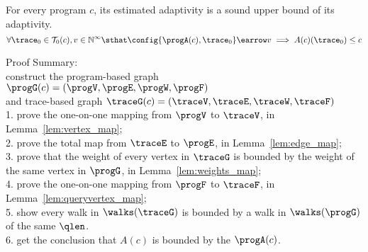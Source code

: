   
\begin{thm}
	For every program $c$, 
	its estimated adaptivity is a sound upper bound of its adaptivity.
	 \[
	 \forall \trace_0 \in \mathcal{T}_{0}(c), v \in \mathbb{N}^{\infty} \sthat  
  \config{\progA(c), \trace_0} \earrow v \implies A(c)(\trace_0) \leq c
  \] 
  \end{thm}
Proof Summary:
\\
construct the
program-based graph $\progG({c}) = (\progV, \progE, \progW, \progF)$
\\
and trace-based graph $\traceG({c}) = (\traceV, \traceE, \traceW, \traceF)$ 
\\
1. prove the one-on-one mapping from $\progV$ to $\traceV$, in Lemma~\ref{lem:vertex_map};
\\
2. prove the total map from $\traceE$ to $\progE$, in Lemma~\ref{lem:edge_map};
\\
3. prove that the weight of every vertex in $\traceG$ is bounded by the weight of the same vertex in $\progG$, in 
Lemma~\ref{lem:weights_map};
\\
4. prove the one-on-one mapping from $\progF$ to $\traceF$, in Lemma~\ref{lem:queryvertex_map};
\\
5. show every walk in $\walks(\traceG)$ is bounded by a walk in $\walks(\progG)$ of the same $\qlen$.
\\
6. get the conclusion that $A(c)$ is bounded by 
the $\progA(c)$.
%
